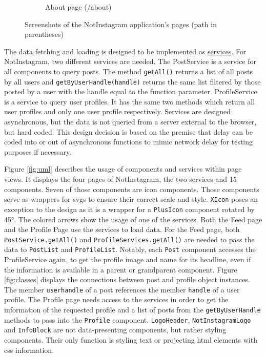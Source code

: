 \documentclass[a4paper, 12pt]{article}
\begin{document}
\begin{figure}[ht!]
\begin{subfigure}{0.49\linewidth}
\begin{center}
    \end{center}
    \caption{About page (/about)}\label{subfig:about}
  \end{subfigure}
  \caption{Screenshots of the NotInstagram application's pages (path in parentheses)}\label{fig:screenshots}
\end{figure}

The data fetching and loading is designed to be implemented as \hyperref[enum:services]{services}.
For NotInstagram, two different services are needed.
The PostService is a service for all components to query posts.
The method \verb|getAll()| returns a list of all posts by all users and \verb|getByUserHandle(handle)| returns the same list filtered by those posted by a user with the handle equal to the function parameter.
ProfileService is a service to query user profiles.
It has the same two methods which return all user profiles and only one user profile respectively.
Services are designed asynchronous, but the data is not queried from a server external to the browser, but hard coded.
This design decision is based on the premise that delay can be coded into or out of asynchronous functions to mimic network delay for testing purposes if necessary.

Figure \ref{fig:uml} describes the usage of components and services within page views.
It displays the four pages of NotInstagram, the two services and 15 components.
Seven of those components are icon components.
Those components serve as wrappers for \acrshort{svg}s to ensure their correct scale and style.
\verb|XIcon| poses an exception to the design as it is a wrapper for a \verb|PlusIcon| component rotated by 45°.
The colored arrows show the usage of one of the services.
Both the Feed page and the Profile Page use the services to load data.
For the Feed page, both \verb|PostService.getAll()| and \verb|ProfileServices.getAll()| are needed to pass the data to \verb|PostList| and \verb|ProfileList|.
Notably, each \verb|Post| component accesses the ProfileService again, to get the profile image and name for its headline, even if the information is available in a parent or grandparent component.
Figure \ref{fig:classes} displays the connections between post and profile object instances.
The member \verb|userhandle| of a post references the member \verb|handle| of a user profile.
The Profile page needs access to the services in order to get the information of the requested profile and a list of posts from the \verb|getByUserHandle| methods to pass into the \verb|Profile| component.
\verb|LogoHeader|, \verb|NotInstagramLogo| and \verb|InfoBlock| are not data-presenting components, but rather styling components.
Their only function is styling text or projecting \acrshort{html} elements with \acrshort{css} information.
\end{document}
